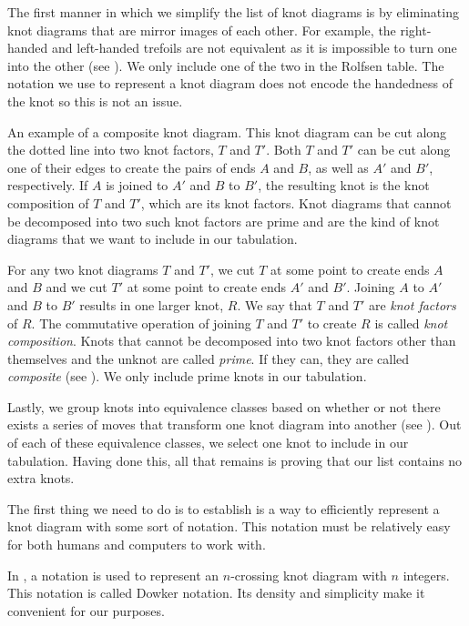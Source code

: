 \begin{paper}
The first manner in which we simplify the list of knot diagrams is by
eliminating knot diagrams that are mirror images of each other.
For example, the right-handed and left-handed trefoils are not equivalent as it
is impossible to turn one into the other (see \figTrefoil).
We only include one of the two in the Rolfsen table.
The notation we use to represent a knot diagram does not encode the handedness
of the knot so this is not an issue.

{\begin{center}\end{center}}
{An example of a composite knot diagram.
This knot diagram can be cut along the dotted line into two knot factors, $T$
and $T'$.
Both $T$ and $T'$ can be cut along one of their edges to create the pairs of
ends $A$ and $B$, as well as $A'$ and $B'$, respectively.
If $A$ is joined to $A'$ and $B$ to $B'$, the resulting knot is the knot
composition of $T$ and $T'$, which are its knot factors.
Knot diagrams that cannot be decomposed into two such knot factors are prime and
are the kind of knot diagrams that we want to include in our tabulation.}

For any two knot diagrams $T$ and $T'$, we cut $T$ at some point to create ends
$A$ and $B$ and we cut $T'$ at some point to create ends $A'$ and $B'$.
Joining $A$ to $A'$ and $B$ to $B'$ results in one larger knot, $R$.
We say that $T$ and $T'$ are \textit{knot factors} of $R$.
The commutative operation of joining $T$ and $T'$ to create $R$ is called
\textit{knot composition}.
Knots that cannot be decomposed into two knot factors other than themselves and
the unknot are called \textit{prime}.
If they can, they are called \textit{composite} (see \figComposite).
We only include prime knots in our tabulation.

Lastly, we group knots into equivalence classes based on whether or not there
exists a series of moves that transform one knot diagram into another (see
\figMoves).
Out of each of these equivalence classes, we select one knot to include in our
tabulation.
Having done this, all that remains is proving that our list contains no extra
knots.


The first thing we need to do is to establish is a way to efficiently represent
a knot diagram with some sort of notation.
This notation must be relatively easy for both humans and computers to work
with.

In \cite{htw}, a notation is used to represent an $n$-crossing knot diagram with
$n$ integers.
This notation is called Dowker notation.
Its density and simplicity make it convenient for our purposes.


\end{paper}
